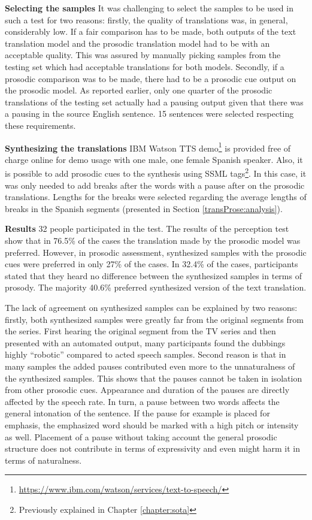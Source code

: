 \textbf{Selecting the samples} It was challenging to select the samples to be used in such a test for two reasons: firstly, the quality of translations was, in general, considerably low. If a fair comparison has to be made, both outputs of the text translation model and the prosodic translation model had to be with an acceptable quality. This was assured by manually picking samples from the testing set which had acceptable translations for both models. Secondly, if a prosodic comparison was to be made, there had to be a prosodic cue output on the prosodic model. As reported earlier, only one quarter of the prosodic translations of the testing set actually had a pausing output given that there was a pausing in the source English sentence. 15 sentences were selected respecting these requirements. 

\textbf{Synthesizing the translations} IBM Watson TTS demo\footnote{\url{https://www.ibm.com/watson/services/text-to-speech/}} is provided free of charge online for demo usage with one male, one female Spanish speaker. Also, it is possible to add prosodic cues to the synthesis using SSML tags\footnote{Previously explained in Chapter \ref{chapter:sota}}. In this case, it was only needed to add breaks after the words with a pause after on the prosodic translations. Lengths for the breaks were selected regarding the average lengths of breaks in the Spanish segments (presented in Section \ref{transProse:analysis}). 



\textbf{Results} 32 people participated in the test. The results of the perception test show that in 76.5\% of the cases the translation made by the prosodic model was preferred. However, in prosodic assessment, synthesized samples with the prosodic cues were preferred in only 27\% of the cases. In 32.4\% of the cases, participants stated that they heard no difference between the synthesized samples in terms of prosody. The majority 40.6\% preferred synthesized version of the text translation. 

The lack of agreement on synthesized samples can be explained by two reasons: firstly, both synthesized samples were greatly far from the original segments from the series. First hearing the original segment from the TV series and then presented with an automated output, many participants found the dubbings highly ``robotic'' compared to acted speech samples. Second reason is that in many samples the added pauses contributed even more to the unnaturalness of the synthesized samples. This shows that the pauses cannot be taken in isolation from other prosodic cues. Appearance and duration of the pauses are directly affected by the speech rate. In turn, a pause between two words affects the general intonation of the sentence. If the pause for example is placed for emphasis, the emphasized word should be marked with a high pitch or intensity as well. Placement of a pause without taking account the general prosodic structure does not contribute in terms of expressivity and even might harm it in terms of naturalness. 

